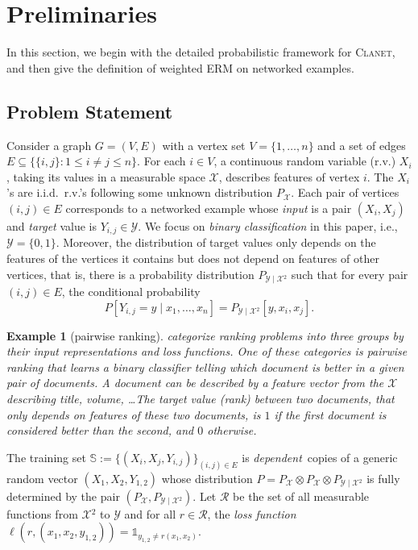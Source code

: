 \documentclass[letterpaper]{article} %
\newtheorem{example}{Example}
\newcommand{\indicator}{\mathds 1}
\newcommand{\xspace}{\mathcal{X}}
\newcommand{\yspace}{\mathcal{Y}}
\newcommand{\distribution}{P}
\newcommand{\edge}[1]{\{#1\}}
\newcommand{\pair}[1]{(#1)}
\newcommand{\problemabbr}{\textnormal{C}\textsc{lanet}}
\newcommand{\trainingset}{\mathbb{S}}
\begin{document}
\section{Preliminaries} %
\label{sec:preliminaries}

In this section, we begin with the detailed probabilistic framework for \problemabbr{}, and then give the definition of weighted ERM on networked examples. 

\subsection{Problem Statement} %
\label{sub:problem_statement}

Consider a graph $G=(V,E)$ with a vertex set $V=\{1,\dots,n\}$ and a set of edges $E\subseteq\{\edge{i,j}: 1\le i\neq j\le n\}$. 
For each $i\in V$, a continuous random variable (r.v.) $X_i$, taking its values in a measurable space $\xspace{}$, describes features of vertex $i$. The $X_i$'s are i.i.d.\ r.v.'s following some unknown distribution $P_\xspace$.
Each pair of vertices $\pair{i,j}\in E$ corresponds to a networked example whose \emph{input} is a pair $(X_i,X_j)$ and \emph{target} value is $Y_{i,j}\in\yspace{}.$ 
We focus on \emph{binary classification} in this paper, i.e., $\yspace{} = \{0,1\}$. 
Moreover, the distribution of target values only depends on the features of the vertices it contains but does not depend on features of other vertices, that is, there is a probability distribution $P_{\yspace{}\mid\xspace{}^2}$ such that for every pair $\pair{i,j}\in E$, the conditional probability 
\[P\left[Y_{i,j}=y\mid x_1,\ldots,x_n\right]=P_{\yspace{}\mid\xspace{}^2}\left[y,x_i,x_j\right].\]  

\begin{example}[pairwise ranking]
\cite{liu2009learning} categorize ranking problems into three groups by their input representations and loss functions. One of these categories is \emph{pairwise ranking} that learns a binary classifier telling which document is better in a given pair of documents. A document can be described by a feature vector from the $\xspace$ describing title, volume, \ldots The target value (rank) between two documents, that only depends on features of these two documents, is $1$ if the first document is considered better than the second, and $0$ otherwise. 
\end{example}

The training set $\trainingset:=\{(X_i,X_j,Y_{i,j})\}_{\pair{i,j}\in E}$ is \emph{dependent}\ copies of a generic random vector $(X_1, X_2, Y_{1,2})$ whose distribution $\distribution{}=P_\xspace\otimes P_\xspace\otimes P_{\yspace{}\mid\xspace{}^2}$ is fully determined by the pair $(P_\xspace{}, P_{\yspace{}\mid\xspace{}^2})$. 
Let $\mathcal{R}$ be the set of all measurable functions from $\xspace{}^2$ to $\yspace{}$ and for all $r\in\mathcal{R}$, the \emph{loss function} $\ell(r,(x_1,x_2,y_{1,2}))=\indicator_{y_{1,2}\neq r(x_1,x_2)}$. 
\end{document}
